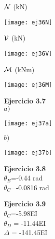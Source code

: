 ${\mathcal N}$ (kN)

\begin{center}
	\texttt{[image: ej36N]}
\end{center}

${\mathcal V}$ (kN)

\begin{center}
	\texttt{[image: ej36V]}
\end{center}

${\mathcal M}$ (kNm)

\begin{center}
	\texttt{[image: ej36M]}
\end{center}


\textbf{Ejercicio 3.7}\\

$a)$

\begin{center}
	\texttt{[image: ej37a]}
\end{center}

$b)$

\begin{center}
	\texttt{[image: ej37b]}
\end{center}

\textbf{Ejercicio 3.8}\\

$\theta_B$=-0.44 rad \\
$\theta_C$=-0.0816 rad\newline

\textbf{Ejercicio 3.9}\\

$\theta_C$=-5.98\;EI \\
$\theta_D$ = -11.44\;EI \\
$\Delta$ = -141.45\;EI

